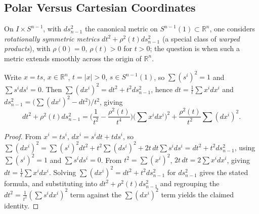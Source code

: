 \subsection{Polar Versus Cartesian Coordinates}

\begin{definition}
  \label{def:pet-ch1-rot-sym-general}
  \leanok
  On $I\times S^{n-1}$, with $ds^2_{n-1}$ the canonical metric on
  $S^{n-1}(1)\subset\mathbb{R}^n$, one considers \emph{rotationally symmetric metrics}
  $dt^2+\rho^2(t)ds^2_{n-1}$ (a special class of \emph{warped products}), with
  $\rho(0)=0$, $\rho(t)>0$ for $t>0$; the question is when such a metric extends
  smoothly across the origin of $\mathbb{R}^n$.
\end{definition}

\begin{lemma}
  \label{lem:pet-ch1-polar-coordinate-change}
  \leanok
  Write $x=ts$, $x\in\mathbb{R}^n$, $t=|x|>0$, $s\in S^{n-1}(1)$, so
  $\sum(s^i)^2=1$ and $\sum s^ids^i=0$. Then $\sum(dx^i)^2=dt^2+t^2ds_{n-1}^2$,
  hence $dt=\tfrac1t\sum x^idx^i$ and $ds_{n-1}^2=\big(\sum(dx^i)^2-dt^2\big)/t^2$,
  giving
  \[
    dt^2+\rho^2(t)ds_{n-1}^2
    =\Big(\frac1{t^2}-\frac{\rho^2(t)}{t^4}\Big)\Big(\sum x^idx^i\Big)^2
    +\frac{\rho^2(t)}{t^2}\sum(dx^i)^2.
  \]
\end{lemma}
\begin{proof}
  \leanok
  From $x^i=ts^i$, $dx^i=s^idt+tds^i$, so
  $\sum(dx^i)^2=\sum(s^i)^2dt^2+t^2\sum(ds^i)^2+2t\,dt\sum s^ids^i
  =dt^2+t^2ds_{n-1}^2$, using $\sum(s^i)^2=1$ and $\sum s^ids^i=0$. From
  $t^2=\sum(x^i)^2$, $2t\,dt=2\sum x^idx^i$, giving $dt=\tfrac1t\sum x^idx^i$.
  Solving $\sum(dx^i)^2=dt^2+t^2ds_{n-1}^2$ for $ds_{n-1}^2$ gives the stated
  formula, and substituting into $dt^2+\rho^2(t)ds_{n-1}^2$ and regrouping the
  $dt^2=\tfrac1{t^2}(\sum s^idx^i)^2$ term against the $\sum(dx^i)^2$ term yields
  the claimed identity.
\end{proof}

